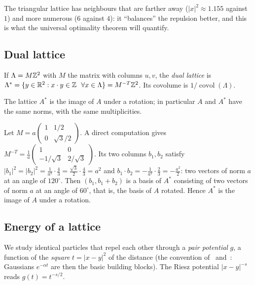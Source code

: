 The triangular lattice has neighbours that are farther away ($|x|^2\approx1.155$ against $1$) and more numerous ($6$ against $4$):
it ``balances'' the repulsion better, and this is what the universal optimality theorem will quantify.

\subsection{Dual lattice}

\begin{definition}\label{ch1:def:dual}
If $\Lambda=M\mathbb{Z}^2$ with $M$ the matrix with columns $u,v$, the \emph{dual lattice} is
$\Lambda^*=\{y\in\mathbb{R}^2 : x\cdot y\in\mathbb{Z}\ \ \forall x\in\Lambda\}=M^{-T}\mathbb{Z}^2$. Its covolume is $1/\operatorname{covol}(\Lambda)$.
\end{definition}

\begin{lemma}\label{ch1:lem:autodual}
The lattice $A^*$ is the image of $A$ under a rotation; in particular $A$ and $A^*$ have the same norms, with the same multiplicities. \tierC{}
\end{lemma}

\begin{humanproof}
Let $M=a\begin{pmatrix}1&1/2\\0&\sqrt3/2\end{pmatrix}$. A direct computation gives
$M^{-T}=\frac1a\begin{pmatrix}1&0\\-1/\sqrt3&2/\sqrt3\end{pmatrix}$. Its two columns $b_1,b_2$ satisfy
$|b_1|^2=|b_2|^2=\frac{1}{a^2}\cdot\frac43=\frac{\sqrt3}{2}\cdot\frac43=a^2$ and $b_1\cdot b_2=-\frac{1}{a^2}\cdot\frac23=-\frac{a^2}{2}$:
two vectors of norm $a$ at an angle of $120^\circ$. Then $(b_1,b_1+b_2)$ is a basis of $A^*$ consisting of two vectors
of norm $a$ at an angle of $60^\circ$, that is, the basis of $A$ rotated. Hence $A^*$ is the image of $A$ under a rotation.
\end{humanproof}

\subsection{Energy of a lattice}

We study identical particles that repel each other through a \emph{pair potential} $g$, a function of the \emph{square} $t=|x-y|^2$ of
the distance (the convention of~\cite{ckmrv} and~\cite{oai}: Gaussians $e^{-\alpha t}$ are then the basic building blocks).
The Riesz potential $|x-y|^{-s}$ reads $g(t)=t^{-s/2}$.

